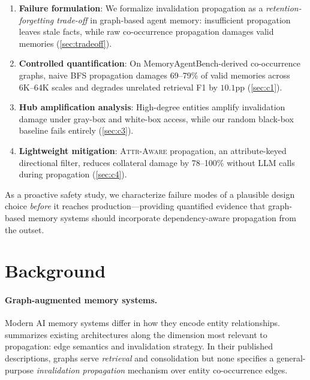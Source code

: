 \documentclass{article}
\newcommand{\attraware}{\textsc{Attr-Aware}}
\begin{document}
\begin{enumerate}
  \item \textbf{Failure formulation}: We formalize invalidation propagation as a \textit{retention-forgetting trade-off} in graph-based agent memory: insufficient propagation leaves stale facts, while raw co-occurrence propagation damages valid memories (\cref{sec:tradeoff}).

  \item \textbf{Controlled quantification}: On MemoryAgentBench-derived co-occurrence graphs, naive BFS propagation damages 69--79\% of valid memories across 6K--64K scales and degrades unrelated retrieval F1 by $10.1$pp (\cref{sec:c1}).

  \item \textbf{Hub amplification analysis}: High-degree entities amplify invalidation damage under gray-box and white-box access, while our random black-box baseline fails entirely (\cref{sec:c3}).

  \item \textbf{Lightweight mitigation}: \attraware{} propagation, an attribute-keyed directional filter, reduces collateral damage by 78--100\% without LLM calls during propagation (\cref{sec:c4}).
\end{enumerate}

\noindent As a proactive safety study, we characterize failure modes of a plausible design choice \textit{before} it reaches production---providing quantified evidence that graph-based memory systems should incorporate dependency-aware propagation from the outset.


\section{Background}
\label{sec:background}

\paragraph{Graph-augmented memory systems.}
Modern AI memory systems differ in how they encode entity relationships.
 summarizes existing architectures along the dimension most relevant to propagation: edge semantics and invalidation strategy.
In their published descriptions, graphs serve \textit{retrieval} and consolidation but none specifies a general-purpose \textit{invalidation propagation} mechanism over entity co-occurrence edges.
\end{document}
